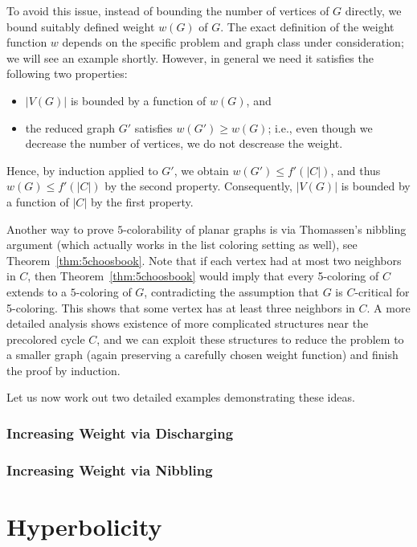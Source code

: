 \documentclass[12pt,twoside,openright,a4paper]{book}
\begin{document}
To avoid this issue, instead of bounding the number of vertices of $G$ directly, we bound suitably defined weight $w(G)$
of $G$.  The exact definition of the weight function $w$ depends on the specific problem and graph class under consideration;
we will see an example shortly.  However, in general we need it satisfies the following two properties:
\begin{itemize}
\item $|V(G)|$ is bounded by a function of $w(G)$, and
\item the reduced graph $G'$ satisfies $w(G')\ge w(G)$; i.e., even though we decrease the number of vertices,
we do not descrease the weight.
\end{itemize}
Hence, by induction applied to $G'$, we obtain $w(G')\le f'(|C|)$, and thus $w(G)\le f'(|C|)$ by the second property.
Consequently, $|V(G)|$ is bounded by a function of $|C|$ by the first property.

Another way to prove $5$-colorability of planar graphs is via Thomassen's nibbling argument (which actually works
in the list coloring setting as well), see Theorem~\ref{thm:5choosbook}.  Note that if each vertex 
had at most two neighbors in $C$, then Theorem~\ref{thm:5choosbook} would imply that every 5-coloring of $C$ extends to a $5$-coloring
of $G$, contradicting the assumption that $G$ is $C$-critical for 5-coloring.  This shows that some vertex has at least three
neighbors in $C$.  A more detailed analysis shows existence of more complicated structures near the precolored cycle $C$,
and we can exploit these structures to reduce the problem to a smaller graph (again preserving a carefully chosen weight function)
and finish the proof by induction.

Let us now work out two detailed examples demonstrating these ideas.

\subsection{Increasing Weight via Discharging}


\subsection{Increasing Weight via Nibbling}

\chapter{Hyperbolicity}\label{chap:hyper}
\end{document}
